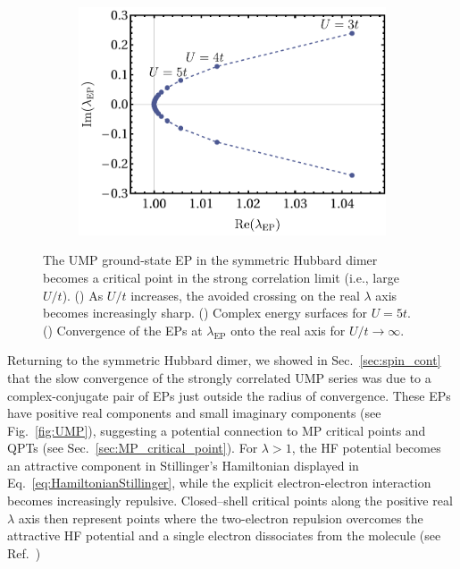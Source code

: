 \documentclass[aps,prb,reprint,noshowkeys,superscriptaddress]{revtex4-1}
\newcommand{\latin}[1]{#1}
\newcommand{\ie}{\latin{i.e.}}
\newcommand{\lep}{\lambda_{\text{EP}}}
\begin{document}
\begin{figure}[t]
\begin{subfigure}{0.32\textwidth}
	\includegraphics[height=0.75\textwidth]{fig8c}	
		\subcaption{\label{subfig:ump_ep_to_cp}}
    \end{subfigure}
\caption{%
    The UMP ground-state EP in the symmetric Hubbard dimer becomes a critical point in the strong correlation limit (\ie, large $U/t$).
    () As $U/t$ increases, the avoided crossing on the real $\lambda$ axis
    becomes increasingly sharp.
    () Complex energy surfaces for $U = 5t$.
    () Convergence of the EPs at $\lep$ onto the real axis for $U/t \to \infty$.
\label{fig:UMP_cp}}

\end{figure}

Returning to the symmetric Hubbard dimer, we showed in Sec.~\ref{sec:spin_cont} that the slow
convergence of the strongly correlated UMP series
was due to a complex-conjugate pair of EPs just outside the radius of convergence.
These EPs have positive real components and small imaginary components (see Fig.~\ref{fig:UMP}), suggesting a potential 
connection to MP critical points and QPTs (see Sec.~\ref{sec:MP_critical_point}).
For $\lambda>1$, the HF potential becomes an attractive component in Stillinger's 
Hamiltonian displayed in Eq.~\eqref{eq:HamiltonianStillinger}, while the explicit electron-electron interaction
becomes increasingly repulsive.
Closed--shell critical points along the positive real $\lambda$ axis then represent 
points where the two-electron repulsion overcomes the attractive HF potential 
and a single electron dissociates from the molecule (see Ref.~)
\end{document}
